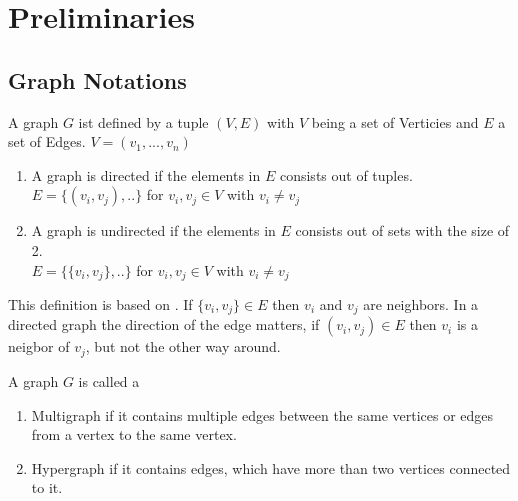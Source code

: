 \chapter{Preliminaries}
\label{Preliminaries}
\section{Graph Notations}
\begin{mydef}
A graph $G$ ist defined by a tuple $(V,E)$ with $V$ being a set of Verticies and $E$ a set of Edges.
$V = (v_{1}, ..., v_{n})$
\begin{enumerate}
 \item A graph is directed if the elements in $E$ consists out of tuples.\\
 $E = \{(v_{i},v_{j}),..\}$ for $v_{i},v_{j} \in V$ with $v_{i} \neq v_{j}$
 \item A graph is undirected if the elements in $E$ consists out of sets with the size of 2.\\
 $E = \{\{v_{i},v_{j}\},..\}$ for $v_{i},v_{j} \in V$ with $v_{i} \neq v_{j}$
\end{enumerate}
\end{mydef}
This definition is based on \cite{Diestel.2012}. If $\{v_{i},v_{j}\} \in E$ then $v_{i}$ and $v_{j}$ are neighbors. In a directed graph the direction of the edge matters, if $(v_{i},v_{j}) \in E$ then $v_{i}$ is a neigbor of $v_{j}$, but not the other way around.
\begin{mydef}
A graph $G$ is called a
\begin{enumerate}
 \item Multigraph if it contains multiple edges between the same vertices or edges from a vertex to the same vertex.
 \item Hypergraph if it contains edges, which have more than two vertices connected to it.
\end{enumerate}
\end{mydef}
